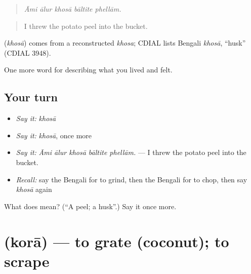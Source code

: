 \begin{quote}
    
\end{quote}

\begin{quote}
\emph{Āmi ālur khosā bāltite phellām.}
\end{quote}

\begin{quote}
I threw the potato peel into the bucket.
\end{quote}

\begin{cousinweb}
\textbf{} (\emph{khosā}) comes from a reconstructed \emph{khosa}; CDIAL lists Bengali \emph{khosā}, \textquotedblleft{}husk\textquotedblright{} (CDIAL 3948).
\end{cousinweb}

\begin{grammarlens}[title={What you've built}]
One more word for describing what you lived and felt.
\end{grammarlens}

\subsection*{Your turn}
\begin{itemize}
\raggedright
  \item \emph{Say it:} \emph{khosā}
  \item \emph{Say it:} \emph{khosā}, once more
  \item \emph{Say it:} \emph{Āmi ālur khosā bāltite phellām.} — I threw the potato peel into the bucket.
  \item \emph{Recall:} say the Bengali for to grind, then the Bengali for to chop, then say \emph{khosā} again
\end{itemize}

\begin{tcolorbox}[breakable,colback=teal!4,colframe=teal!35!black,title={Before you move on}]
What does  mean? (\textquotedblleft{}A peel; a husk\textquotedblright{}.) Say it once more.
\end{tcolorbox}
\section[\texorpdfstring{\bn{কোরা} (korā)}{কোরা (korā)}]{ (korā) — to grate (coconut); to scrape}

\label{lesson:BN-C513-kora-grate}



